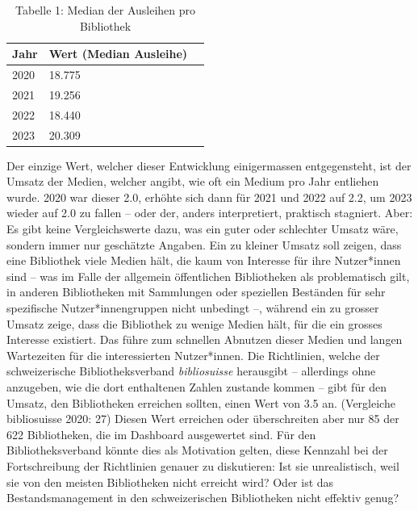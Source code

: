 \documentclass[a4paper,
fontsize=11pt,
oneside,
numbers=noperiodatend,
parskip=half-,
bibliography=totoc,
final
]{scrartcl}
\begin{document}
\begin{table}[]\centering
\begin{tabular}{lll}
\hline
\textbf{Jahr} & \textbf{Wert (Median Ausleihe)} \\ \hline
2020          & 18.775                          \\ \hline
2021          & 19.256                          \\ \hline
2022          & 18.440                          \\ \hline
2023          & 20.309                          \\ \hline
\end{tabular}
\caption{Tabelle 1: Median der Ausleihen pro Bibliothek}
\end{table}

Der einzige Wert, welcher dieser Entwicklung einigermassen
entgegensteht, ist der Umsatz der Medien, welcher angibt, wie oft ein
Medium pro Jahr entliehen wurde. 2020 war dieser 2.0, erhöhte sich dann
für 2021 und 2022 auf 2.2, um 2023 wieder auf 2.0 zu fallen -- oder der,
anders interpretiert, praktisch stagniert. Aber: Es gibt keine
Vergleichswerte dazu, was ein guter oder schlechter Umsatz wäre, sondern
immer nur geschätzte Angaben. Ein zu kleiner Umsatz soll zeigen, dass
eine Bibliothek viele Medien hält, die kaum von Interesse für ihre
Nutzer*innen sind -- was im Falle der allgemein öffentlichen
Bibliotheken als problematisch gilt, in anderen Bibliotheken mit
Sammlungen oder speziellen Beständen für sehr spezifische
Nutzer*innengruppen nicht unbedingt --, während ein zu grosser Umsatz
zeige, dass die Bibliothek zu wenige Medien hält, für die ein grosses
Interesse existiert. Das führe zum schnellen Abnutzen dieser Medien und
langen Wartezeiten für die interessierten Nutzer*innen. Die Richtlinien,
welche der schweizerische Bibliotheksverband \emph{bibliosuisse}
herausgibt -- allerdings ohne anzugeben, wie die dort enthaltenen Zahlen
zustande kommen -- gibt für den Umsatz, den Bibliotheken erreichen
sollten, einen Wert von 3.5 an. (Vergleiche bibliosuisse 2020: 27)
Diesen Wert erreichen oder überschreiten aber nur 85 der 622
Bibliotheken, die im Dashboard ausgewertet sind. Für den
Bibliotheksverband könnte dies als Motivation gelten, diese Kennzahl bei
der Fortschreibung der Richtlinien genauer zu diskutieren: Ist sie
unrealistisch, weil sie von den meisten Bibliotheken nicht erreicht
wird? Oder ist das Bestandsmanagement in den schweizerischen
Bibliotheken nicht effektiv genug?
\end{document}
